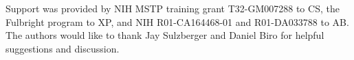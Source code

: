 Support was provided by NIH MSTP training grant T32-GM007288 to CS, the Fulbright program to XP, and NIH R01-CA164468-01 and R01-DA033788 to AB. The authors would like to thank Jay Sulzberger and Daniel Biro for helpful suggestions and discussion.
